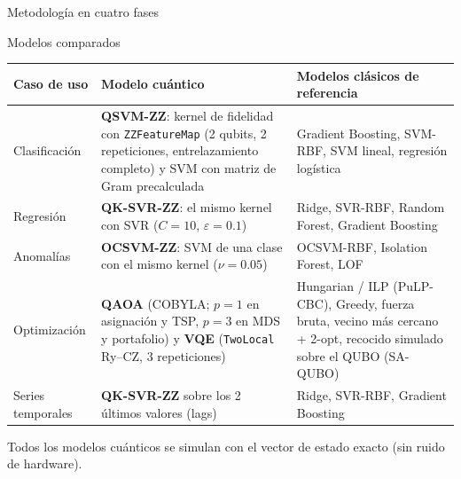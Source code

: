\documentclass[aspectratio=169,10pt,professionalfonts]{beamer}
\begin{document}
\begin{frame}{Metodología en cuatro fases}
\end{frame}

\begin{frame}{Modelos comparados}
\centering
{\footnotesize
\renewcommand{\arraystretch}{1.2}
\begin{tabularx}{\linewidth}{@{}>{\raggedright\arraybackslash}p{1.9cm}>{\raggedright\arraybackslash}X>{\raggedright\arraybackslash}X@{}}
\toprule
\textbf{Caso de uso} & \textbf{Modelo cuántico} & \textbf{Modelos clásicos de referencia} \\
\midrule
Clasificación &
\textbf{QSVM-ZZ}: kernel de fidelidad con \texttt{ZZFeatureMap} (2 qubits, 2 repeticiones,
entrelazamiento completo) y SVM con matriz de Gram precalculada &
Gradient Boosting, SVM-RBF, SVM lineal, regresión logística \\
Regresión &
\textbf{QK-SVR-ZZ}: el mismo kernel con SVR ($C{=}10$, $\varepsilon{=}0.1$) &
Ridge, SVR-RBF, Random Forest, Gradient Boosting \\
Anomalías &
\textbf{OCSVM-ZZ}: SVM de una clase con el mismo kernel ($\nu{=}0.05$) &
OCSVM-RBF, Isolation Forest, LOF \\
Optimización &
\textbf{QAOA} (COBYLA; $p{=}1$ en asignación y TSP, $p{=}3$ en MDS y portafolio) y
\textbf{VQE} (\texttt{TwoLocal} Ry--CZ, 3 repeticiones) &
Hungarian / ILP (PuLP-CBC), Greedy, fuerza bruta, vecino más cercano + 2-opt, recocido simulado sobre el QUBO (SA-QUBO) \\
Series temporales &
\textbf{QK-SVR-ZZ} sobre los 2 últimos valores (lags) &
Ridge, SVR-RBF, Gradient Boosting \\
\bottomrule
\end{tabularx}}

\vspace{0.6em}
{\footnotesize Todos los modelos cuánticos se simulan con el vector de estado exacto (sin ruido de hardware).}
\end{frame}
\end{document}
